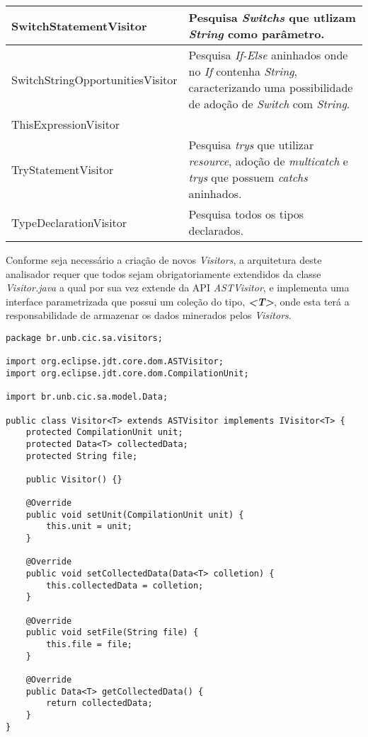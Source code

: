 \begin{table}[ht!]
\begin{tabular}{ >{\arraybackslash}p{2.2in} | >{\arraybackslash}m{3.8in} }
			SwitchStatementVisitor & Pesquisa \textit{Switchs} que utlizam \textit{String} como parâmetro.\\ \hline
			
			SwitchStringOpportunitiesVisitor &  Pesquisa \textit{If-Else} aninhados onde no \textit{If} contenha \textit{String}, caracterizando uma possibilidade de adoção de \textit{Switch} com \textit{String}.\\ \hline
			
			ThisExpressionVisitor &	 \\ \hline
			
			TryStatementVisitor & Pesquisa \textit{trys} que utilizar \textit{resource}, adoção de \textit{multicatch} e \textit{trys} que possuem \textit{catchs} aninhados.\\ \hline
			
			TypeDeclarationVisitor & Pesquisa todos os tipos declarados.\\ \hline 		
		\end{tabular}
\end{table}


Conforme seja necessário a criação de novos \textit{Visitors}, a arquitetura deste analisador requer que todos sejam  obrigatoriamente extendidos da classe \textit{Visitor.java} a qual por sua vez extende da \acs{API}  \textit{ASTVisitor}, e implementa uma interface parametrizada que possui um coleção do tipo, \textit{\textbf{<T>}}, onde esta terá a responsabilidade de armazenar os dados minerados pelos \textit{Visitors}.

\begin{lstlisting}
package br.unb.cic.sa.visitors;

import org.eclipse.jdt.core.dom.ASTVisitor;
import org.eclipse.jdt.core.dom.CompilationUnit;

import br.unb.cic.sa.model.Data;

public class Visitor<T> extends ASTVisitor implements IVisitor<T> {
	protected CompilationUnit unit;
	protected Data<T> collectedData;
	protected String file;
	
	public Visitor() {}
	
	@Override
	public void setUnit(CompilationUnit unit) {
		this.unit = unit;
	}
	
	@Override
	public void setCollectedData(Data<T> colletion) {
		this.collectedData = colletion;
	}
	
	@Override
	public void setFile(String file) {
		this.file = file;
	}

	@Override
	public Data<T> getCollectedData() {
		return collectedData;
	}	
}
\end{lstlisting}


